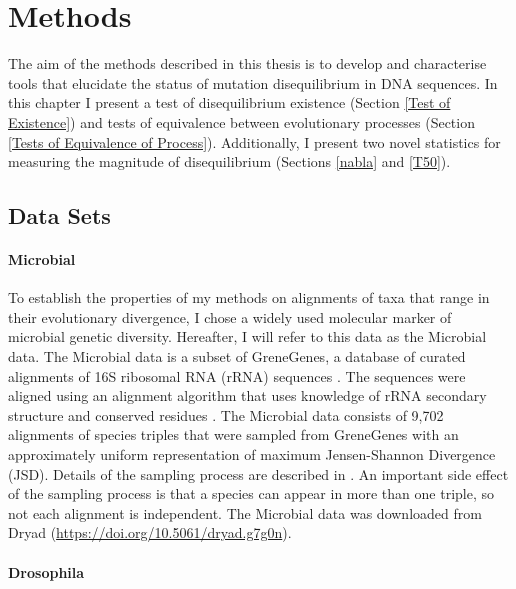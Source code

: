 \chapter{Methods}

The aim of the methods described in this thesis is to develop and characterise tools that elucidate the status of mutation disequilibrium in DNA sequences. In this chapter I present a test of disequilibrium existence (Section \ref{Test of Existence}) and tests of equivalence between evolutionary processes (Section \ref{Tests of Equivalence of Process}). Additionally, I present two novel statistics for measuring the magnitude of disequilibrium (Sections \ref{nabla} and \ref{T50}). 

\section{Data Sets}

\subsubsection{Microbial}

To establish the properties of my methods on alignments of taxa that range in their evolutionary divergence, I chose a widely used molecular marker of microbial genetic diversity. Hereafter, I will refer to this data as the Microbial data. The Microbial data is a subset of GreneGenes, a database of curated alignments of 16S ribosomal RNA (rRNA) sequences \citep{McDonald2012AnArchaea}. The sequences were aligned using an alignment algorithm that uses knowledge of rRNA secondary structure and conserved residues \citep{McDonald2012AnArchaea}. The Microbial data consists of 9,702 alignments of species triples that were sampled from GreneGenes with an approximately uniform representation of maximum Jensen-Shannon Divergence (JSD). Details of the sampling process are described in \citep{Kaehler2015}. An important side effect of the sampling process is that a species can appear in more than one triple, so not each alignment is independent. The Microbial data was downloaded from Dryad (\href{https://doi.org/10.5061/dryad.g7g0n}{https://doi.org/10.5061/dryad.g7g0n}).  

\subsubsection{Drosophila}

